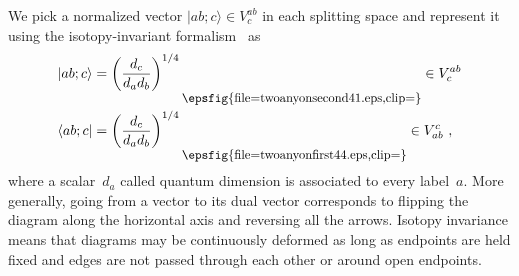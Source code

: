 \documentclass[floats,prb,twocolumn]{revtex4}
\newcommand*{\textfrac}[2]{{{#1}/{#2}}}
\newcommand{\ket}[1]{|#1\rangle}
\newcommand{\bra}[1]{\langle#1|}
\newcommand*{\twoanyonsecond}{\raisebox{-19.305pt}{\epsfig{file=twoanyonsecond41.eps,clip=}}}
\newcommand*{\twoanyonfirst}{\raisebox{-19.026pt}{\epsfig{file=twoanyonfirst44.eps,clip=}}}
\begin{document}
We pick a normalized vector $\ket{ab;c}\in V^{ab}_c$ in each splitting space and represent it using the isotopy-invariant formalism~\cite{Bondersonetal09} as
\begin{align*}
\ket{ab;c}&=\left(\frac{d_c}{d_ad_b}\right)^{\textfrac{1}{4}}\scalebox{0.9}{\twoanyonsecond} \in V^{ab}_c\\
\bra{ab;c}&=\left(\frac{d_c}{d_ad_b}\right)^{\textfrac{1}{4}}\scalebox{0.9}{\twoanyonfirst}\in V^c_{ab}\ ,
\end{align*}
where a scalar~$d_a$ called quantum dimension is associated to every label~$a$.
More generally, going from a vector to its dual vector corresponds to flipping the diagram along the horizontal axis and reversing all the arrows.  Isotopy invariance means that diagrams may be continuously deformed as long as endpoints are held fixed and edges are not passed through each other or around open endpoints. 
 

 
\end{document}
